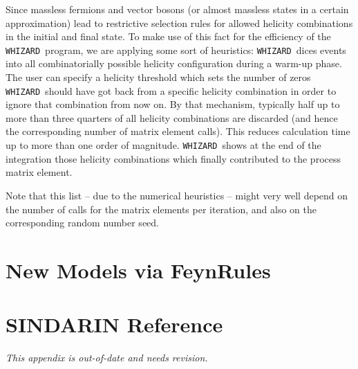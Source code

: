 \documentclass[12pt]{book}
\newcommand{\whizard}{\texttt{WHIZARD}}
\begin{document}
Since massless fermions and vector bosons (or almost massless states
in a certain approximation) lead to restrictive selection rules for
allowed helicity combinations in the initial and final state. To make
use of this fact for the efficiency of the \whizard\ program, we are
applying some sort of heuristics: \whizard\ dices events into all
combinatorially possible helicity configuration during a warm-up
phase. The user can specify a helicity threshold which sets the number
of zeros \whizard\ should have got back from a specific helicity
combination in order to ignore that combination from now on. By that
mechanism, typically half up to more than three quarters of all
helicity combinations are discarded (and hence the corresponding
number of matrix element calls). This reduces calculation time up to
more than one order of magnitude. \whizard\ shows at the end of the
integration those helicity combinations which finally contributed to
the process matrix element.

Note that this list -- due to the numerical heuristics -- might very
well depend on the number of calls for the matrix elements per
iteration, and also on the corresponding random number seed.  


\chapter{New Models via FeynRules}



\appendix

\chapter{SINDARIN Reference}

\emph{This appendix is out-of-date and needs revision.}

\medskip
\end{document}
